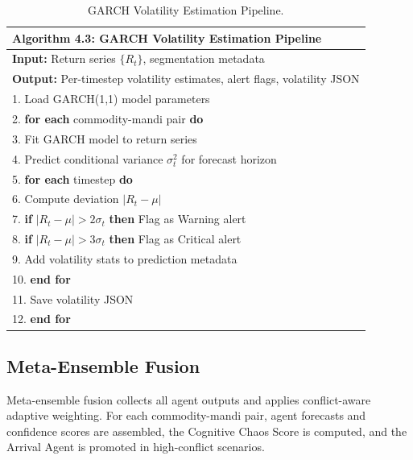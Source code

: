 \documentclass[12pt,a4paper]{report}
\theoremstyle{definition}
\theoremstyle{remark}
\begin{document}
\begin{table}[htbp]
\centering
\caption{GARCH Volatility Estimation Pipeline.}
\label{alg:garch}
\begin{tabular}{p{14cm}}
\hline
\textbf{Algorithm 4.3:} GARCH Volatility Estimation Pipeline \\
\hline
\textbf{Input:} Return series $\{R_t\}$, segmentation metadata \\
\textbf{Output:} Per-timestep volatility estimates, alert flags, volatility JSON \\
\hline
1. Load GARCH(1,1) model parameters \\
2. \textbf{for each} commodity-mandi pair \textbf{do} \\
3. \quad Fit GARCH model to return series \\
4. \quad Predict conditional variance $\sigma_t^2$ for forecast horizon \\
5. \quad \textbf{for each} timestep \textbf{do} \\
6. \quad\quad Compute deviation $|R_t - \mu|$ \\
7. \quad\quad \textbf{if} $|R_t - \mu| > 2\sigma_t$ \textbf{then} Flag as Warning alert \\
8. \quad\quad \textbf{if} $|R_t - \mu| > 3\sigma_t$ \textbf{then} Flag as Critical alert \\
9. \quad\quad Add volatility stats to prediction metadata \\
10. \quad \textbf{end for} \\
11. \quad Save volatility JSON \\
12. \textbf{end for} \\
\hline
\end{tabular}
\end{table}

\subsection{Meta-Ensemble Fusion}

Meta-ensemble fusion collects all agent outputs and applies conflict-aware adaptive weighting. For each commodity-mandi pair, agent forecasts and confidence scores are assembled, the Cognitive Chaos Score is computed, and the Arrival Agent is promoted in high-conflict scenarios.
\end{document}
